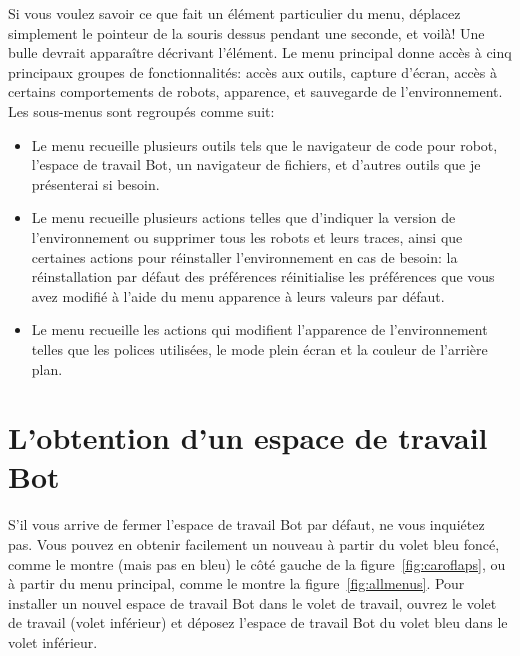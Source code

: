 \documentclass[a4paper,10pt,twoside]{book}
\begin{document}
Si vous voulez savoir ce que fait un \'el\'ement particulier du menu, d\'eplacez simplement le pointeur de la souris dessus pendant une seconde, et voil\`a! Une bulle devrait appara\^itre d\'ecrivant l'\'el\'ement. Le menu principal donne acc\`es \`a cinq principaux groupes de fonctionnalit\'es: acc\`es aux outils, capture d'\'ecran, acc\`es \`a certains comportements de robots, apparence, et sauvegarde de l'environnement. Les sous-menus sont regroup\'es comme suit: 
\begin{itemize}
\item Le menu  recueille plusieurs outils tels que le navigateur de code pour robot, l'espace de travail Bot, un navigateur de fichiers, et d'autres outils que je pr\'esenterai si besoin. 

\item Le menu  recueille plusieurs actions telles que d'indiquer la version de l'environnement ou supprimer tous les robots et leurs traces, ainsi que certaines actions pour r\'einstaller l'environnement en cas de besoin: la r\'einstallation par d\'efaut des pr\'ef\'erences r\'einitialise les pr\'ef\'erences que vous avez modifi\'e \`a l'aide du menu apparence \`a leurs valeurs par d\'efaut. 

\item  Le menu   recueille les actions qui modifient l'apparence de l'environnement telles que les polices utilis\'ees, le mode plein \'ecran et la couleur de l'arri\`ere plan. 
\end{itemize}


\section{L'obtention d'un espace de travail Bot }

S'il vous arrive de fermer l'espace de travail Bot  par d\'efaut, ne vous inqui\'etez pas. Vous pouvez en obtenir facilement un nouveau \`a partir du volet bleu fonc\'e, comme le montre (mais pas en bleu) le c\^ot\'e gauche de la figure~\ref{fig:caroflaps}, ou \`a partir du menu principal, comme le montre la figure~\ref{fig:allmenus}. Pour installer un nouvel espace de travail Bot dans le volet de travail, ouvrez le volet de travail (volet inf\'erieur) et d\'eposez l'espace de travail Bot du volet bleu dans le volet inf\'erieur.
\end{document}
